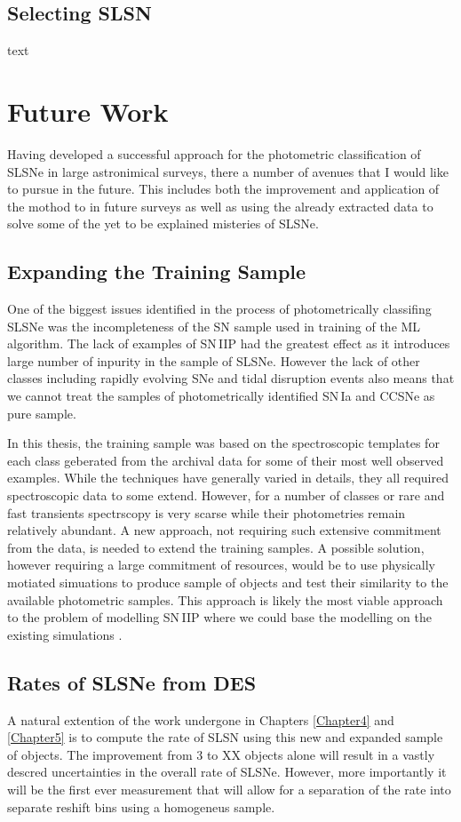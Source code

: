 \subsection{Selecting SLSN}
text

\section{Future Work}
Having developed a successful approach for the photometric classification of SLSNe in large astronimical surveys, there a number of avenues that I would like to pursue in the future. This includes both the improvement and application of the mothod to in future surveys as well as using the already extracted data to solve some of the yet to be explained misteries of SLSNe.

\subsection{Expanding the Training Sample}
One of the biggest issues identified in the process of photometrically classifing SLSNe was the incompleteness of the SN sample used in training of the ML algorithm. The lack of examples of SN\,IIP had the greatest effect as it introduces large number of inpurity in the sample of SLSNe. However the lack of other classes including rapidly evolving SNe and tidal disruption events also means that we cannot treat the samples of photometrically identified SN\,Ia and CCSNe as pure sample.

In this thesis, the training sample was based on the spectroscopic templates for each class geberated from the archival data for some of their most well observed examples. While the techniques have generally varied in details, they all required spectroscopic data to some extend. However, for a number of classes or rare and fast transients spectrscopy is very scarse while their photometries remain relatively abundant. A new approach, not requiring such extensive commitment from the data, is needed to extend the training samples. A possible solution, however requiring a large commitment of resources, would be to use physically motiated simuations to produce sample of objects and test their similarity to the available photometric samples. This approach is likely the most viable approach to the problem of modelling SN\,IIP where we could base the modelling on the existing simulations \citep{Dessart2013,Dessart2016}. 

\subsection{Rates of SLSNe from DES}
A natural extention of the work undergone in Chapters \ref{Chapter4} and \ref{Chapter5} is to compute the rate of SLSN using this new and expanded sample of objects. The improvement from 3 to XX objects alone will result in a vastly descred uncertainties in the overall rate of SLSNe. However, more importantly it will be the first ever measurement that will allow for a separation of the rate into separate reshift bins using a homogeneus sample.

